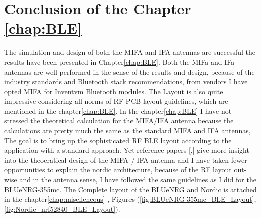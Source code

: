 

\section{Conclusion of the Chapter \ref{chap:BLE}}
The simulation and design of both the MIFA and IFA antennas are successful the results have been presented in Chapter\ref{chap:BLE}.  
Both the MIFa and IFa antennas are well performed in the sense of the results and design, because of the industry standards and Bluetooth stack recommendations, from vendors I have opted MIFA for Inventvm Bluetooth modules. 
The Layout is also quite impressive considering all norms of RF PCB layout guidelines, which are mentioned in the chapter\ref{chap:BLE}.
In the chapter\ref{chap:BLE} I have not stressed the theoretical calculation for the MIFA/IFA antenna because the calculations are pretty much the same as the standard MIFA and IFA antennas, 
The goal is to bring up the sophisticated RF BLE layout according to the application with a standard approach. Yet reference papers [\cite{MIFA_Design_Losito},\cite{MIFA_IFA_difference_Kanan}] give more insight into the theocratical design of the MIFA / IFA antenna and 
I have taken fewer opportunities to explain the nordic architecture, because of the RF layout out-wise and in the antenna sense, I have followed the same guidelines as I did for the BLUeNRG-355mc.
The Complete layout of the BLUeNRG and Nordic is attached in the chapter\ref{chap:miselleneous} , Figures (\ref{fig:BLUeNRG-355mc_BLE_Layout},\ref{fig:Nordic_nrf52840_BLE_Layout}).